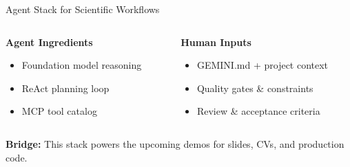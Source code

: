 \documentclass[aspectratio=169]{beamer}
\begin{document}
\begin{frame}{Agent Stack for Scientific Workflows}
  \begin{columns}[T]
    \begin{column}{0.48\textwidth}
      \centering
      \large\bfseries
      \textcolor{conesaTeal}{Agent Ingredients}

      \vspace{0.3cm}
      \normalsize

      \begin{itemize}
        \item Foundation model reasoning
        \item ReAct planning loop
        \item MCP tool catalog
      \end{itemize}
    \end{column}
    \begin{column}{0.48\textwidth}
      \centering
      \large\bfseries
      \textcolor{conesaOrange}{Human Inputs}

      \vspace{0.3cm}
      \normalsize

      \begin{itemize}
        \item GEMINI.md + project context
        \item Quality gates \& constraints
        \item Review \& acceptance criteria
      \end{itemize}
    \end{column}
  \end{columns}

  \vspace{0.5cm}
  \centering
  \normalsize
  \textbf{Bridge:} This stack powers the upcoming demos for slides, CVs, and production code.
\end{frame}
\end{document}
